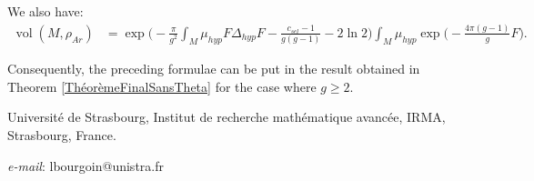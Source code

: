 \documentclass{article}
\theoremstyle{definition}
\theoremstyle{remark}
\DeclareMathOperator{\vol}{vol}
\begin{document}
We also have:
\begin{align*}
    \vol(M,\rho_{Ar})&=\exp\Bigg(-\frac{\pi}{g^{2}}\int_{M}\mu_{hyp} F \Delta_{hyp} F-\frac{c_{sel}-1}{g(g-1)}-2\ln2\Bigg)\int_{M}\mu_{hyp} \exp \bigg(-\frac{4\pi(g-1)}{g}F \bigg).
\end{align*}

Consequently, the preceding formulae can be put in the result obtained in Theorem \ref{ThéorèmeFinalSansTheta} for the case where $g\geq2.$



%
%
\printbibliography

Université de Strasbourg, Institut de recherche mathématique avancée, IRMA, Strasbourg, France.

\emph{e-mail}: lbourgoin@unistra.fr
\end{document}
